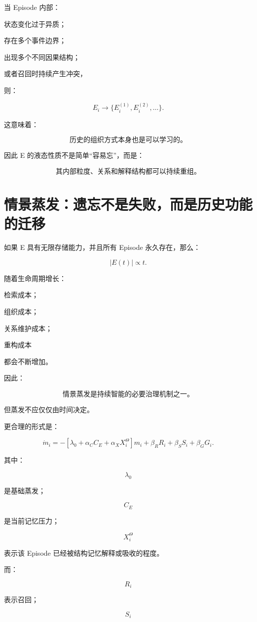 当 Episode 内部：

状态变化过于异质；

存在多个事件边界；

出现多个不同因果结构；

或者召回时持续产生冲突，

则：

\[
\boxed{
E_i
\rightarrow
\{
E_i^{(1)},
E_i^{(2)},
\ldots
\}.
}
\]

这意味着：

\[
\boxed{
\text{历史的组织方式本身也是可以学习的。}
}
\]

因此 E 的液态性质不是简单“容易忘”，而是：

\[
\boxed{
\text{其内部粒度、关系和解释结构都可以持续重组。}
}
\]


\section{情景蒸发：遗忘不是失败，而是历史功能的迁移}

如果 E 具有无限存储能力，并且所有 Episode 永久存在，那么：

\[
|E(t)|
\propto
t.
\]

随着生命周期增长：

检索成本；

组织成本；

关系维护成本；

重构成本

都会不断增加。

因此：

\[
\boxed{
\text{情景蒸发是持续智能的必要治理机制之一。}
}
\]

但蒸发不应仅仅由时间决定。

更合理的形式是：

\[
\boxed{
\dot m_i
=
-
\left[
\lambda_0
+
\alpha_C C_E
+
\alpha_X X_i^\Theta
\right]m_i
+
\beta_RR_i
+
\beta_SS_i
+
\beta_GG_i.
}
\]

其中：

\[
\lambda_0
\]

是基础蒸发；

\[
C_E
\]

是当前记忆压力；

\[
X_i^\Theta
\]

表示该 Episode 已经被结构记忆解释或吸收的程度。

而：

\[
R_i
\]

表示召回；

\[
S_i
\]

